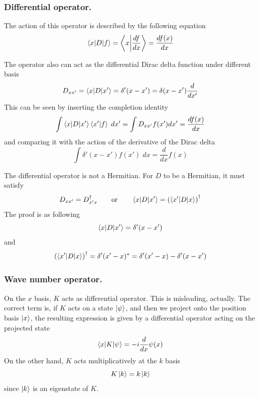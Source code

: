 \documentclass[../../../main.tex]{subfiles}
\begin{document}
\subsubsection{Differential operator.}
The action of this operator is described by the following equation
\begin{equation*}
	\braket{x|D|f}=\left\langle x\bigg| \frac{df }{dx}\right\rangle=\frac{df(x)}{dx}
\end{equation*}

The operator also can act as the differential Dirac delta function under different basis
\begin{equation*}
	D_{xx'}=\braket{x|D|x'}=\delta'(x-x')=\delta(x-x')\frac{d }{dx'}
\end{equation*}
This can be seen by inserting the completion identity
\begin{equation*}
	\int \braket{x|D|x'}\braket{x'|f}\;dx'=\int D_{xx'}f(x')dx'=\frac{df(x)}{dx}
\end{equation*}
and comparing it with the action of the derivative of the Dirac delta
\begin{equation*}
	\int\delta'(x-x')f(x')\;dx=\frac{d }{dx} f(x)
\end{equation*}

The differential operator is not a Hermitian.
For $D$ to be a Hermitian, it must satisfy
\begin{equation*}
	D_{xx'}=D_{x'x}^\dagger\qquad\text{or}\qquad \braket{x|D|x'}=\left(\braket{x'|D|x}\right)^\dagger
\end{equation*}
The proof is as following
\begin{equation*}
	\braket{x|D|x'}=\delta'(x-x')
\end{equation*}
and
\begin{equation*}
	\left(\braket{x'|D|x}\right)^\dagger=\delta'(x'-x)^*=\delta'(x'-x)-\delta'(x-x')
\end{equation*}

\subsubsection{Wave number operator.}
On the $x$ basis, $K$ acts as differential operator.
This is misleading, actually.
The correct term is, if $K$ acts on a state $\ket{\psi}$, and then we project onto the position basis $\ket{x}$, the resulting expression is given by a differential operator acting on the projected state
\begin{equation*}
	\braket{x|K|\psi}=-i \frac{d }{dx}\psi(x)
\end{equation*}
On the other hand, $K$ acts multiplicatively at the $k$ basis
\begin{equation*}
	K\ket{k}=k \ket{k}
\end{equation*}
since $\ket{k}$ is an eigenstate of $K$.
\end{document}
